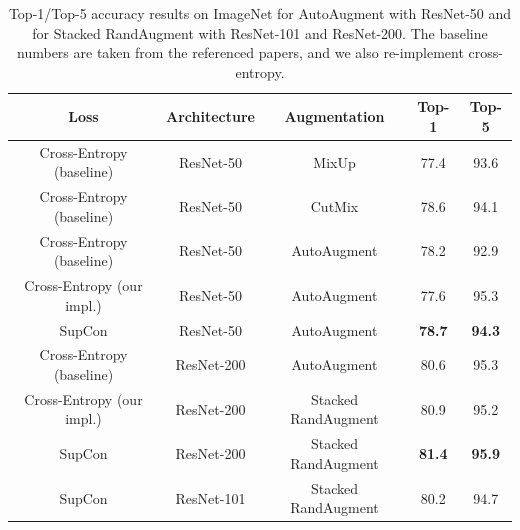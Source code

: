\begin{table}[t]
 \vspace{-10pt}
\centering
\begin{tabular}{ccccc} 
 \toprule
  Loss & Architecture & Augmentation & Top-1 & Top-5 \\\midrule
 Cross-Entropy (baseline) & ResNet-50  & MixUp \cite{zhang2017mixup} & 77.4 & 93.6 \\
 Cross-Entropy (baseline) & ResNet-50 & CutMix \cite{yun2019cutmix} & 78.6 & 94.1 \\
 Cross-Entropy  (baseline) & ResNet-50 & AutoAugment \cite{cubuk2019autoaugment} & 78.2 & 92.9 \\
 Cross-Entropy (our impl.) & ResNet-50 & AutoAugment \cite{lim2019fast} & 77.6 & 95.3 \\ 
 SupCon & ResNet-50 & AutoAugment \cite{cubuk2019autoaugment}
 & {\bf 78.7} & {\bf 94.3} \\ \midrule
 Cross-Entropy (baseline) & ResNet-200 & AutoAugment \cite{cubuk2019autoaugment} & 80.6 & 95.3 \\ 
 Cross-Entropy (our impl.) & ResNet-200 & Stacked RandAugment \cite{tian2020makes} & 80.9 & 95.2 \\ 
 SupCon & ResNet-200 & Stacked RandAugment \cite{tian2020makes}
 & {\bf 81.4} & {\bf 95.9} \\ \midrule
 SupCon & ResNet-101 & Stacked RandAugment \cite{tian2020makes} & 80.2 & 94.7 \\ \bottomrule
 
\end{tabular}
\vspace{2mm}
\caption{Top-1/Top-5 accuracy results on ImageNet for AutoAugment \cite{cubuk2019autoaugment} with ResNet-50 and for Stacked RandAugment \cite{tian2020makes} with ResNet-101 and ResNet-200. The baseline numbers are taken from the referenced papers, and we also re-implement cross-entropy.}
 \vspace{-20pt}
\label{table:imagenet_top1}
\end{table}

 

